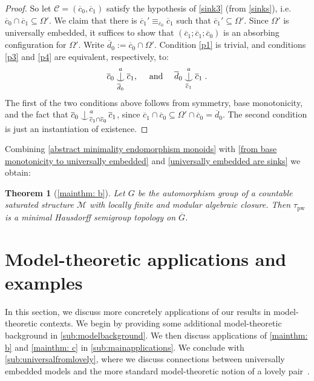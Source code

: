 \documentclass{article}
\newtheorem{theorem}{Theorem}[section]
\theoremstyle{remark}
\theoremstyle{definition}
\newcommand{\M}[0]{\mathcal{M}}
\newcommand{\pw}[0]{\tau_{\mathrm{pw}}}
\newcommand{\C}[0]{\mathcal{C}}
\def\Ind#1#2{#1\setbox0=\hbox{$#1x$}\kern\wd0\hbox to 0pt{\hss$#1\mid$\hss}
	\lower.9\ht0\hbox to 0pt{\hss$#1\smile$\hss}\kern\wd0}
\def\ind{\mathop{\mathpalette\Ind{}}}
\begin{document}
{{{{{\begin{proof}
    
    {
  So let $\C = (\overline{c}_0, \overline{c}_1)$ satisfy the hypothesis of \ref{sink3} (from \cref{sinks}), i.e.\ %
$\overline{c}_0 \cap \overline{c}_1 \subseteq {\Omega'}$.}
  	We claim that there is $\overline{c}_1'\equiv_{\overline{c}_0} \overline{c}_1$ such that $\overline{c}_1'\subseteq\Omega'$. Since $\Omega'$ is universally embedded, it suffices to show that $(\overline{c}_1; \overline{c}_1; \overline{c}_0)$ is an absorbing configuration for $\Omega'$. Write $\overline{d}_0:=\overline{c}_0\cap \Omega'$. Condition \ref{p1} is trivial, and conditions 
    \ref{p3} and \ref{p4}  are equivalent, respectively, to:
  	\begin{equation*}
\overline{c}_{0}\ind^{a}_{\overline{d}_0} \overline{c}_{1},\quad\text{ and } \quad \overline{d}_{0}\ind^{a}_{\overline{c}_{1}}\overline{c}_{1}\;.
  	\end{equation*}
    The first of the two conditions above follows from symmetry, base monotonicity, and the fact that $\overline{c}_0\ind^{a}_{\overline{c}_1\cap \overline{c}_0} \overline{c}_1$, since $\overline{c}_1\cap \overline{c}_0  \subseteq{\Omega'\cap \overline{c}_{0}=}\overline{d}_{0}
    $. 
    {The second condition is just an instantiation of existence.}
  \end{proof}
  
  
  
  
   


  
  
  
 
  Combining \cref{abstract minimality endomorphism monoids} with \cref{from base monotonicity to universally embedded} and \cref{universally embedded are sinks} we obtain:
  \begin{theorem}[\cref{mainthm: b}]\label{t:minimality endomorphism monoids}
  	Let $G$ be the automorphism group of a  countable saturated structure $\M$ with %
    locally finite {and modular} algebraic closure. 
    Then $\pw$ is a minimal Hausdorff semigroup topology on $\overline{G}$. 
  \end{theorem}


\section{Model-theoretic applications and examples}\label{sec:discussion}
{In this section, we discuss more concretely applications of our results in model-theoretic contexts. We begin
by providing some additional model-theoretic background in \cref{sub:modelbackground}. We then discuss applications of \cref{mainthm: b} and \cref{mainthm: c} in \cref{sub:mainapplications}. We conclude with \cref{sub:universalfromlovely}, where we discuss connections between universally embedded models and the more standard model-theoretic notion of a lovely pair~\cite{berenstein2010lovely}.}

}}}}}
\end{document}
